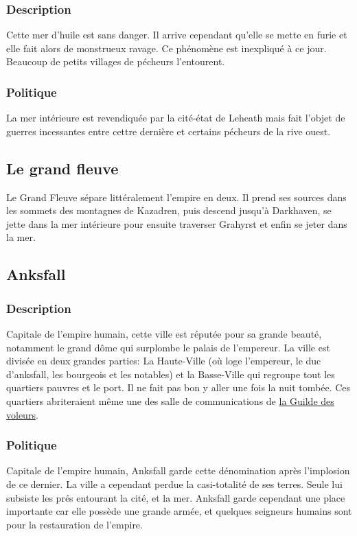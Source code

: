 \subsubsection{Description}
\hypertarget {lamerinterieure}{}Cette mer d'huile est sans danger.
Il arrive cependant qu’elle se mette en furie et elle fait alors de monstrueux ravage.
Ce phénomène est inexpliqué à ce jour.
Beaucoup de petits villages de pécheurs l'entourent.
\subsubsection{Politique}
La mer intérieure est revendiquée par la cité-état de Leheath mais fait l'objet de guerres incessantes entre cettre dernière et certains pécheurs de la rive ouest.
\subsection{Le grand fleuve}
Le Grand Fleuve sépare littéralement l'empire en deux. Il prend ses sources dans les sommets des montagnes de Kazadren, puis descend jusqu'à Darkhaven, se jette dans la mer intérieure pour ensuite traverser Grahyrst et enfin se jeter dans la mer.
\subsection{Anksfall}
\subsubsection{Description}
\hypertarget{anksfall}{}Capitale de l'empire humain, cette ville est réputée pour sa grande beauté,
notamment le grand dôme qui surplombe le palais de l'empereur. 
La ville est divisée en deux grandes parties: La Haute-Ville 
(où loge l’empereur, le duc d'anksfall, les bourgeois et les notables)
et la Basse-Ville qui regroupe tout les quartiers pauvres et le port.
Il ne fait pas bon y aller une fois la nuit tombée.
Ces quartiers abriteraient même une des salle de communications de \hyperlink {laguildedesvoleurs}{la Guilde des voleurs}.
\subsubsection{Politique}
Capitale de l'empire humain, Anksfall garde cette dénomination après l'implosion de ce dernier. La ville a cependant perdue la casi-totalité de ses terres. Seule lui subsiste les prés entourant la cité, et la mer.
\newline
Anksfall garde cependant une place importante car elle possède une grande armée, et quelques seigneurs humains sont pour la restauration de l'empire.
